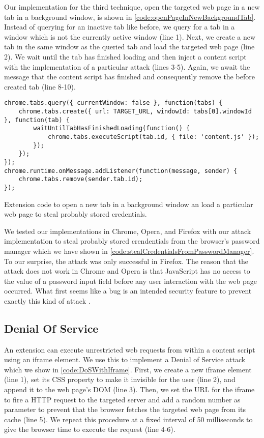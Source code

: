 	Our implementation for the third technique, open the targeted web page in a new tab in a background window, is shown in \autoref{code:openPageInNewBackgroundTab}. Instead of querying for an inactive tab like before, we query for a tab in a window which is not the currently active window (line 1). Next, we create a new tab in the same window as the queried tab and load the targeted web page (line 2). We wait until the tab has finished loading and then inject a content script with the implementation of a particular attack (lines 3-5). Again, we await the message that the content script has finished and consequently remove the before created tab (line 8-10).

	\begin{code}
		\begin{lstlisting}
chrome.tabs.query({ currentWindow: false }, function(tabs) {	
	chrome.tabs.create({ url: TARGET_URL, windowId: tabs[0].windowId },	function(tab) {
		waitUntilTabHasFinishedLoading(function() {
			chrome.tabs.executeScript(tab.id, { file: 'content.js' });	
		});
	});
});
chrome.runtime.onMessage.addListener(function(message, sender) {
	chrome.tabs.remove(sender.tab.id);
});
\end{lstlisting}
		\caption{Extension code to open a new tab in a background window an load a particular web page to steal probably stored credentials.}
		\label{code:openPageInNewBackgroundTab}
	\end{code}
			
	We tested our implementations in Chrome, Opera, and Firefox with our attack implementation to steal probably stored crendentials from the browser's password manager which we have shown in \autoref{code:stealCredentialsFromPasswordManager}. To our surprise, the attack was only successful in Firefox. The reason that the attack does not work in Chrome and Opera is that JavaScript has no access to the value of a password input field before any user interaction with the web page occurred. What first seems like a bug is an intended security feature to prevent exactly this kind of attack \cite{chromiumBlogPasswordInput}.


\subsection{Denial Of Service}

	An extension can execute unrestricted web requests from within a content script using an iframe element. We use this to implement a Denial of Service attack which we show in \autoref{code:DoSWithIframe}. First, we create a new iframe element (line 1), set its CSS property to make it invisible for the user (line 2), and append it to the web page's DOM (line 3). Then, we set the URL for the iframe to fire a HTTP request to the targeted server and add a random number as parameter to prevent that the browser fetches the targeted web page from its cache (line 5). We repeat this procedure at a fixed interval of 50 milliseconds to give the browser time to execute the request (line 4-6).


